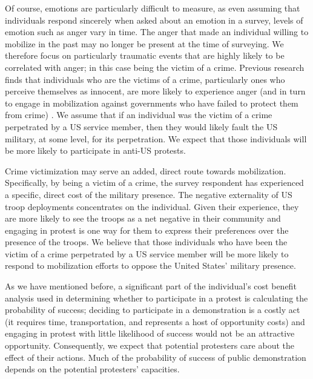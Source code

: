 Of course, emotions are particularly difficult to measure, as even assuming that individuals respond sincerely when asked about an emotion in a survey, levels of emotion such as anger vary in time. The anger that made an individual willing to mobilize in the past may no longer be present at the time of surveying. We therefore focus on particularly traumatic events that are highly likely to be correlated with anger; in this case being the victim of a crime. Previous research finds that individuals who are the victims of a crime, particularly ones who perceive themselves as innocent, are more likely to experience anger (and in turn to engage in mobilization against governments who have failed to protect them from crime) \cite{Garland2012,Garcia2019}. We assume that if an individual was the victim of a crime perpetrated by a US service member, then they would likely fault the US military, at some level, for its perpetration. We expect that those individuals will be more likely to participate in anti-US protests. 

Crime victimization may serve an added, direct route towards mobilization. Specifically, by being a victim of a crime, the survey respondent has experienced a specific, direct cost of the military presence. The negative externality of US troop deployments concentrates on the individual. Given their experience, they are more likely to see the troops as a net negative in their community and engaging in protest is one way for them to express their preferences over the presence of the troops. We believe that those individuals who have been the victim of a crime perpetrated by a US service member will be more likely to respond to mobilization efforts to oppose the United States' military presence. 

 


As we have mentioned before, a significant part of the individual's cost benefit analysis used in determining whether to participate in a protest is calculating the probability of success; deciding to participate in a demonstration is a costly act (it requires time, transportation, and represents a host of opportunity costs) and engaging in protest with little likelihood of success would not be an attractive opportunity. Consequently, we expect that potential protesters care about the effect of their actions. Much of the probability of success of public demonstration depends on the potential protesters' capacities. 

